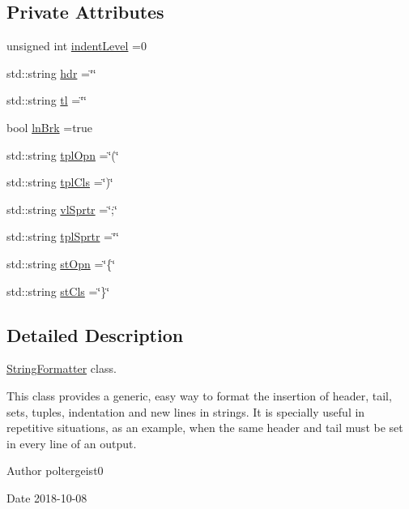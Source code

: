 \subsection*{Private Attributes}
\begin{DoxyCompactItemize}
\item 
unsigned int \hyperlink{classStringFormatter_abfc97d0e97c3bd49bdab35e119d227ab}{indent\+Level} =0
\item 
std\+::string \hyperlink{classStringFormatter_a66634ca3141e9578d88b4c011bd0f6ec}{hdr} =\char`\"{}\char`\"{}
\item 
std\+::string \hyperlink{classStringFormatter_a81440b72b762c4ac312730ae61ad0acd}{tl} =\char`\"{}\char`\"{}
\item 
bool \hyperlink{classStringFormatter_a64779e9f08811c34b51cfdc25d5a552d}{ln\+Brk} =true
\item 
std\+::string \hyperlink{classStringFormatter_a4845b9a05aad17819bb26d999e5c4b17}{tpl\+Opn} =\char`\"{}(\char`\"{}
\item 
std\+::string \hyperlink{classStringFormatter_a1866ee220b758acb9b435f5d60dbe840}{tpl\+Cls} =\char`\"{})\char`\"{}
\item 
std\+::string \hyperlink{classStringFormatter_a8ebb161c2bf20bf501b4b42590dc5835}{vl\+Sprtr} =\char`\"{};\char`\"{}
\item 
std\+::string \hyperlink{classStringFormatter_a7d7e47ef54cd20d27a1a56d29bcd98f5}{tpl\+Sprtr} =\char`\"{}\char`\"{}
\item 
std\+::string \hyperlink{classStringFormatter_ab29fbaab2f88ecef0334b8f2ee3f77bc}{st\+Opn} =\char`\"{}\{\char`\"{}
\item 
std\+::string \hyperlink{classStringFormatter_a90dc61f197d9611b6d85b1eb251507b7}{st\+Cls} =\char`\"{}\}\char`\"{}
\end{DoxyCompactItemize}


\subsection{Detailed Description}
\hyperlink{classStringFormatter}{String\+Formatter} class. 

This class provides a generic, easy way to format the insertion of header, tail, sets, tuples, indentation and new lines in strings. It is specially useful in repetitive situations, as an example, when the same header and tail must be set in every line of an output.

\begin{DoxyAuthor}{Author}
poltergeist0
\end{DoxyAuthor}
\begin{DoxyDate}{Date}
2018-\/10-\/08 
\end{DoxyDate}


